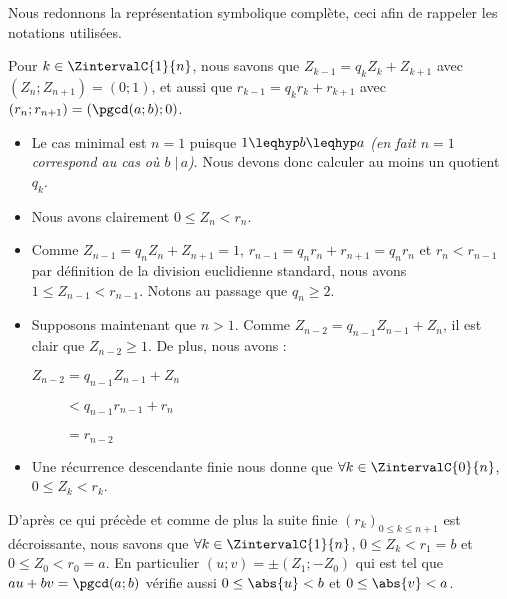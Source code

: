 Nous redonnons la représentation symbolique complète, ceci afin de rappeler les notations utilisées. 



\medskip


Pour $k \in \ZintervalC{1}{n}$, nous savons que $Z_{k-1} = q_k Z_k + Z_{k+1}$ avec $(Z_{n} ; Z_{n+1}) = (0 ; 1)$, et aussi que $r_{k-1} = q_k r_k + r_{k+1}$ avec $(r_{n} ; r_{n+1}) = (\pgcd(a;b) ; 0)$.


\vspace{-.25em}
\begin{itemize}[label = \small\textbullet]
	\item Le cas minimal est $n = 1$ puisque $1 \leqhyp b \leqhyp a$ \emph{(en fait $n = 1$ correspond au cas où $b \;|\, a$)}.
	Nous devons donc calculer au moins un quotient $q_k$.


	\item Nous avons clairement $0 \leq Z_n < r_n$.


	\item
	Comme $Z_{n-1} = q_n Z_n + Z_{n+1} = 1$, $r_{n-1} = q_n r_n + r_{n+1} = q_n r_n$ et $r_n < r_{n-1}$ par définition de la division euclidienne standard, nous avons $1 \leq Z_{n-1} < r_{n-1}$. Notons au passage que $q_n \geq 2$.
	
	\item Supposons maintenant que $n > 1$. Comme $Z_{n-2} = q_{n-1} Z_{n-1} + Z_{n}$, il est clair que $Z_{n-2} \geq 1$.
	De plus, nous avons :
	
	\smallskip
	
	\noindent
	$Z_{n-2}
	 = q_{n-1} Z_{n-1} + Z_{n}$

	\noindent
	$\phantom{Z_{n-2}}
	 < q_{n-1} r_{n-1} + r_n$

	\noindent
	$\phantom{Z_{n-2}}
	 = r_{n-2}$
	 
	
	\item Une récurrence descendante finie nous donne que $\forall k \in \ZintervalC{0}{n}$, $0 \leq Z_k < r_k$.
\end{itemize}


\medskip


D'après ce qui précède et comme de plus la suite finie $(r_k)_{0 \leq k \leq n+1}$ est décroissante, nous savons que $\forall k \in \ZintervalC{1}{n}$, $0 \leq Z_k < r_1 = b$ et $0 \leq Z_0 < r_0 = a$.
En particulier $(u ; v) = \pm (Z_1 ; -Z_0)$ qui est tel que $au + bv = \pgcd(a;b)$ vérifie aussi $0 \leq \abs{u} < b$ et $0 \leq \abs{v} < a$.


